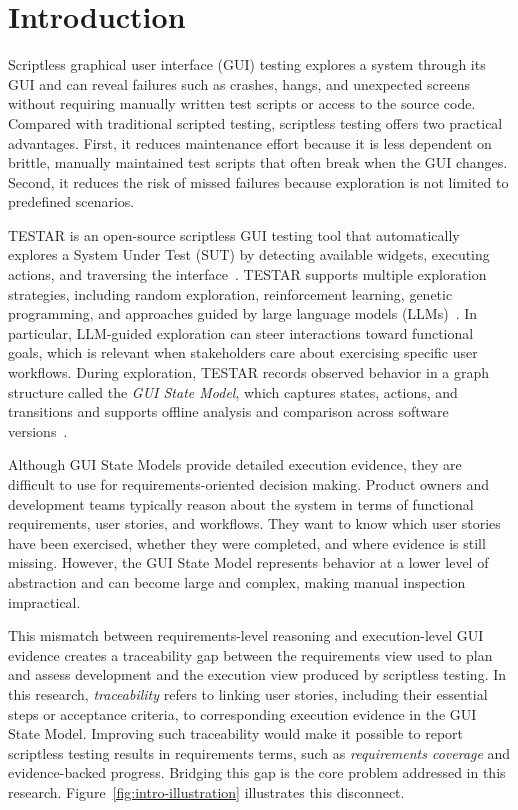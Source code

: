 \section{Introduction}
\label{sec:introduction}

Scriptless graphical user interface (GUI) testing explores a system through its GUI and can reveal failures such as crashes, hangs, and unexpected screens without requiring manually written test scripts or access to the source code. Compared with traditional scripted testing, scriptless testing offers two practical advantages. First, it reduces maintenance effort because it is less dependent on brittle, manually maintained test scripts that often break when the GUI changes. Second, it reduces the risk of missed failures because exploration is not limited to predefined scenarios.

TESTAR is an open-source scriptless GUI testing tool that automatically explores a System Under Test (SUT) by detecting available widgets, executing actions, and traversing the interface~\citep{vos2021testar}. TESTAR supports multiple exploration strategies, including random exploration, reinforcement learning, genetic programming, and approaches guided by large language models (LLMs)~\citep{esparcia2016q,esparcia2018using,van2025llm}. In particular, LLM-guided exploration can steer interactions toward functional goals, which is relevant when stakeholders care about exercising specific user workflows. During exploration, TESTAR records observed behavior in a graph structure called the \emph{GUI State Model}, which captures states, actions, and transitions and supports offline analysis and comparison across software versions~\citep{de2019offline,ricos2025delta}.

Although GUI State Models provide detailed execution evidence, they are difficult to use for requirements-oriented decision making. Product owners and development teams typically reason about the system in terms of functional requirements, user stories, and workflows. They want to know which user stories have been exercised, whether they were completed, and where evidence is still missing. However, the GUI State Model represents behavior at a lower level of abstraction and can become large and complex, making manual inspection impractical.

This mismatch between requirements-level reasoning and execution-level GUI evidence creates a traceability gap between the requirements view used to plan and assess development and the execution view produced by scriptless testing. In this research, \emph{traceability} refers to linking user stories, including their essential steps or acceptance criteria, to corresponding execution evidence in the GUI State Model. Improving such traceability would make it possible to report scriptless testing results in requirements terms, such as \emph{requirements coverage} and evidence-backed progress. Bridging this gap is the core problem addressed in this research. Figure~\ref{fig:intro-illustration} illustrates this disconnect.

